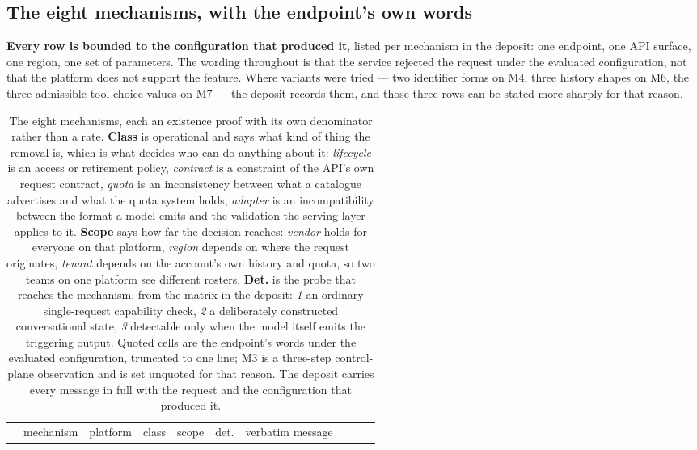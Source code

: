 \subsection{The eight mechanisms, with the endpoint's own words}

\textbf{Every row is bounded to the configuration that produced it}, listed per mechanism in the deposit:
one endpoint, one API surface, one region, one set of parameters. The wording throughout is that the service
rejected the request under the evaluated configuration, not that the platform does not support the
feature. Where
variants were tried --- two identifier forms on M4, three history shapes on M6, the three admissible
tool-choice values on M7 --- the deposit records them, and those three rows can be stated more sharply for
that reason.

\begin{table}[!t]
\caption{The eight mechanisms, each an existence proof with its own denominator rather than a rate.
\textbf{Class} is operational and says what kind of thing the removal is, which is what decides who can do
anything about it: \emph{lifecycle} is an access or retirement policy, \emph{contract} is a constraint of
the API's own request contract, \emph{quota} is an inconsistency between what a catalogue advertises and
what the quota system holds, \emph{adapter} is an incompatibility between the format a model emits and the
validation the serving layer applies to it. \textbf{Scope} says how far the decision reaches:
\emph{vendor} holds for everyone on that platform, \emph{region} depends on where the request originates,
\emph{tenant} depends on the account's own history and quota, so two teams on one platform see different
rosters. \textbf{Det.} is the probe that reaches the mechanism, from the matrix in the deposit:
\emph{1} an ordinary single-request capability check, \emph{2} a deliberately constructed conversational
state, \emph{3} detectable only when the model itself emits the triggering output. Quoted cells are the
endpoint's words under the evaluated configuration, truncated to one line; M3 is a three-step control-plane
observation and is set unquoted for that reason. The deposit carries every message in full with the request
and the configuration that produced it.}
\label{tab:mechanisms}
\centering
\small
\setlength{\tabcolsep}{3pt}
\begin{tabular}{@{}l P{0.155\linewidth} l l l c P{0.375\linewidth}@{}}
\toprule
& mechanism & platform & class & scope & det. & verbatim message \\

\end{tabular}
\end{table}
